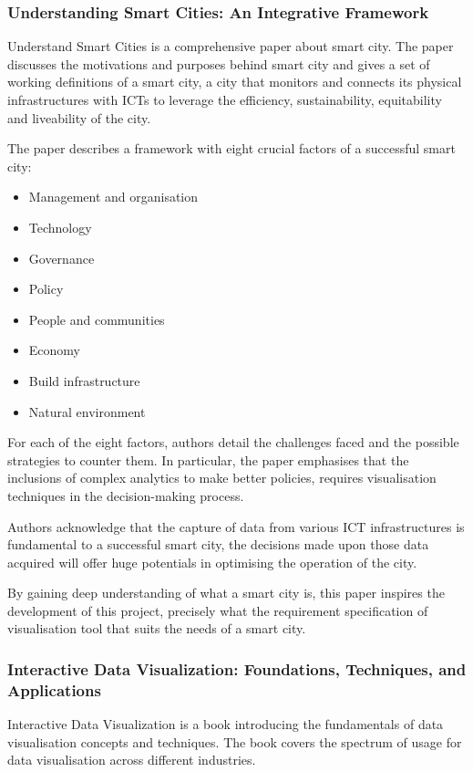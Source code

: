 \documentclass[11pt,a4paper]{article}
\begin{document}
\subsubsection{Understanding Smart Cities: An Integrative Framework}
Understand Smart Cities \parencite{Chourabi2011} is a comprehensive paper about smart city. The paper discusses the motivations and purposes behind smart city and gives a set of working definitions of a smart city, a city that monitors and connects its physical infrastructures with ICTs to leverage the efficiency, sustainability, equitability and liveability of the city. 

The paper describes a framework with eight crucial factors of a successful smart city:
\begin{multicols}{2}
		
	\begin{itemize}
		\item Management and organisation
		\item Technology
		\item Governance
		\item Policy
		\item People and communities
		\item Economy
		\item Build infrastructure
		\item Natural environment
	\end{itemize}
\end{multicols}
For each of the eight factors, authors detail the challenges faced and the possible strategies to counter them. In particular, the paper emphasises that the inclusions of complex analytics to make better policies, requires visualisation techniques in the decision-making process.

Authors acknowledge that the capture of data from various ICT infrastructures is fundamental to a successful smart city, the decisions made upon those data acquired will offer huge potentials in optimising the operation of the city.

By gaining deep understanding of what a smart city is, this paper inspires the development of this project, precisely what the requirement specification of visualisation tool that suits the needs of a smart city.

\subsubsection{Interactive Data Visualization: Foundations, Techniques, and Applications}
Interactive Data Visualization is a book \parencite{Ward2010} introducing the fundamentals of data visualisation concepts and techniques. The book covers the spectrum of usage for data visualisation across different industries.
\end{document}
